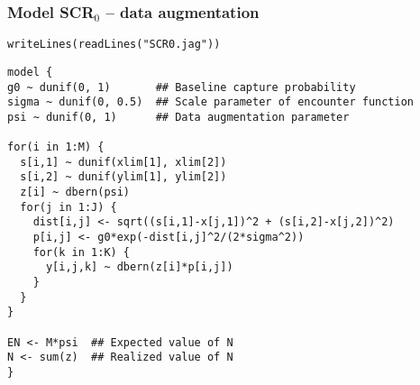 \documentclass[color=usenames,dvipsnames]{beamer}\usepackage[]{graphicx}\usepackage[]{color}
\makeatletter
\newcommand{\hlstr}[1]{\textcolor[rgb]{0.749,0.012,0.012}{#1}}%
\newcommand{\hlstd}[1]{\textcolor[rgb]{0,0,0}{#1}}%
\newcommand{\hlkwd}[1]{\textcolor[rgb]{0.004,0.004,0.506}{#1}}%
\newenvironment{kframe}{%
 \def\at@end@of@kframe{}%
 \ifinner\ifhmode%
  \def\at@end@of@kframe{\end{minipage}}%
  \begin{minipage}{\columnwidth}%
 \fi\fi%
 \def\FrameCommand##1{\hskip\@totalleftmargin \hskip-\fboxsep
 \colorbox{shadecolor}{##1}\hskip-\fboxsep
     \hskip-\linewidth \hskip-\@totalleftmargin \hskip\columnwidth}%
 \MakeFramed {\advance\hsize-\width
   \@totalleftmargin\z@ \linewidth\hsize
   \@setminipage}}%
 {\par\unskip\endMakeFramed%
 \at@end@of@kframe}
\newenvironment{knitrout}{}{} %
\makeatother
\begin{document}
\begin{frame}[fragile]
  \frametitle{Model SCR$_0$ -- data augmentation}
\vspace{-3pt}
\begin{knitrout}\scriptsize
{}\color{fgcolor}\begin{kframe}
\begin{alltt}
\hlkwd{writeLines}\hlstd{(}\hlkwd{readLines}\hlstd{(}\hlstr{"SCR0.jag"}\hlstd{))}
\end{alltt}
\end{kframe}
\end{knitrout}
\begin{knitrout}\scriptsize
{}\color{fgcolor}\begin{kframe}
\begin{verbatim}
model {
g0 ~ dunif(0, 1)       ## Baseline capture probability
sigma ~ dunif(0, 0.5)  ## Scale parameter of encounter function
psi ~ dunif(0, 1)      ## Data augmentation parameter

for(i in 1:M) {
  s[i,1] ~ dunif(xlim[1], xlim[2])
  s[i,2] ~ dunif(ylim[1], ylim[2])
  z[i] ~ dbern(psi)
  for(j in 1:J) {
    dist[i,j] <- sqrt((s[i,1]-x[j,1])^2 + (s[i,2]-x[j,2])^2)
    p[i,j] <- g0*exp(-dist[i,j]^2/(2*sigma^2))
    for(k in 1:K) {
      y[i,j,k] ~ dbern(z[i]*p[i,j])
    }
  }
}

EN <- M*psi  ## Expected value of N
N <- sum(z)  ## Realized value of N
}
\end{verbatim}
\end{kframe}
\end{knitrout}
\end{frame}
\end{document}

